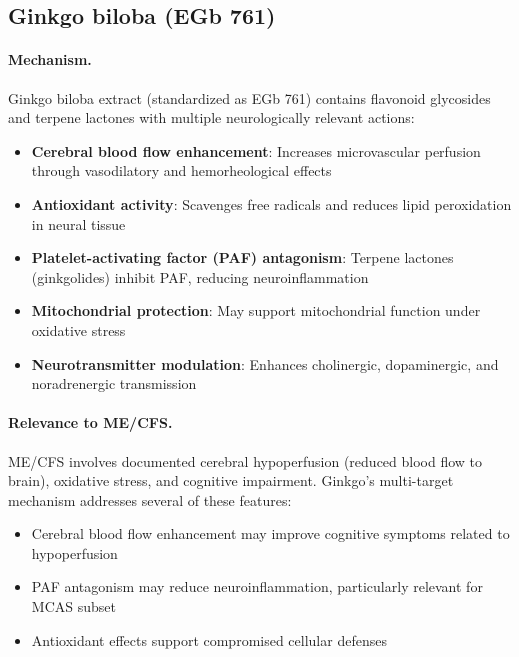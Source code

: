 \subsection{Ginkgo biloba (EGb 761)}
\label{subsec:ginkgo}

\paragraph{Mechanism.}
Ginkgo biloba extract (standardized as EGb 761) contains flavonoid glycosides and terpene lactones with multiple neurologically relevant actions:
\begin{itemize}
    \item \textbf{Cerebral blood flow enhancement}: Increases microvascular perfusion through vasodilatory and hemorheological effects
    \item \textbf{Antioxidant activity}: Scavenges free radicals and reduces lipid peroxidation in neural tissue
    \item \textbf{Platelet-activating factor (PAF) antagonism}: Terpene lactones (ginkgolides) inhibit PAF, reducing neuroinflammation
    \item \textbf{Mitochondrial protection}: May support mitochondrial function under oxidative stress
    \item \textbf{Neurotransmitter modulation}: Enhances cholinergic, dopaminergic, and noradrenergic transmission
\end{itemize}

\paragraph{Relevance to ME/CFS.}
ME/CFS involves documented cerebral hypoperfusion (reduced blood flow to brain), oxidative stress, and cognitive impairment. Ginkgo's multi-target mechanism addresses several of these features:
\begin{itemize}
    \item Cerebral blood flow enhancement may improve cognitive symptoms related to hypoperfusion
    \item PAF antagonism may reduce neuroinflammation, particularly relevant for MCAS subset
    \item Antioxidant effects support compromised cellular defenses
\end{itemize}

